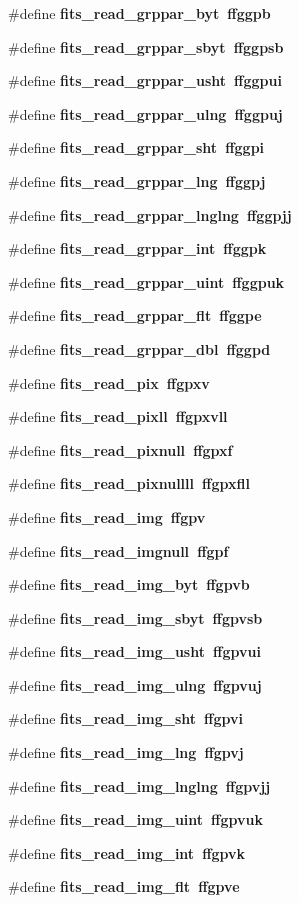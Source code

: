 \begin{CompactItemize}
\item 
\#define \bf{fits\_\-read\_\-grppar\_\-byt}~ffggpb
\item 
\#define \bf{fits\_\-read\_\-grppar\_\-sbyt}~ffggpsb
\item 
\#define \bf{fits\_\-read\_\-grppar\_\-usht}~ffggpui
\item 
\#define \bf{fits\_\-read\_\-grppar\_\-ulng}~ffggpuj
\item 
\#define \bf{fits\_\-read\_\-grppar\_\-sht}~ffggpi
\item 
\#define \bf{fits\_\-read\_\-grppar\_\-lng}~ffggpj
\item 
\#define \bf{fits\_\-read\_\-grppar\_\-lnglng}~ffggpjj
\item 
\#define \bf{fits\_\-read\_\-grppar\_\-int}~ffggpk
\item 
\#define \bf{fits\_\-read\_\-grppar\_\-uint}~ffggpuk
\item 
\#define \bf{fits\_\-read\_\-grppar\_\-flt}~ffggpe
\item 
\#define \bf{fits\_\-read\_\-grppar\_\-dbl}~ffggpd
\item 
\#define \bf{fits\_\-read\_\-pix}~ffgpxv
\item 
\#define \bf{fits\_\-read\_\-pixll}~ffgpxvll
\item 
\#define \bf{fits\_\-read\_\-pixnull}~ffgpxf
\item 
\#define \bf{fits\_\-read\_\-pixnullll}~ffgpxfll
\item 
\#define \bf{fits\_\-read\_\-img}~ffgpv
\item 
\#define \bf{fits\_\-read\_\-imgnull}~ffgpf
\item 
\#define \bf{fits\_\-read\_\-img\_\-byt}~ffgpvb
\item 
\#define \bf{fits\_\-read\_\-img\_\-sbyt}~ffgpvsb
\item 
\#define \bf{fits\_\-read\_\-img\_\-usht}~ffgpvui
\item 
\#define \bf{fits\_\-read\_\-img\_\-ulng}~ffgpvuj
\item 
\#define \bf{fits\_\-read\_\-img\_\-sht}~ffgpvi
\item 
\#define \bf{fits\_\-read\_\-img\_\-lng}~ffgpvj
\item 
\#define \bf{fits\_\-read\_\-img\_\-lnglng}~ffgpvjj
\item 
\#define \bf{fits\_\-read\_\-img\_\-uint}~ffgpvuk
\item 
\#define \bf{fits\_\-read\_\-img\_\-int}~ffgpvk
\item 
\#define \bf{fits\_\-read\_\-img\_\-flt}~ffgpve
\item 

\end{CompactItemize}
